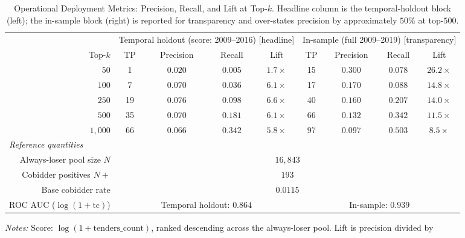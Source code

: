 \begin{table}[htbp]
\centering
\caption[Operational metrics: holdout headline]{Operational
Deployment Metrics: Precision, Recall, and Lift at Top-$k$.
Headline column is the temporal-holdout block (left); the
in-sample block (right) is reported for transparency and
over-states precision by approximately $50\%$ at top-$500$.}
\label{tab:operational_metrics}
\begin{adjustbox}{max width=\textwidth}
\begin{threeparttable}
\small
\begin{tabular}{rcccccccc}
\toprule
& \multicolumn{4}{c}{Temporal holdout (score: 2009--2016) [headline]} & \multicolumn{4}{c}{In-sample (full 2009--2019) [transparency]} \\
\cmidrule(lr){2-5}\cmidrule(lr){6-9}
Top-$k$ & TP & Precision & Recall & Lift & TP & Precision & Recall & Lift \\
\midrule
$50$ & 1 & $0.020$ & $0.005$ & $1.7\!\!\times$ & 15 & $0.300$ & $0.078$ & $26.2\!\!\times$ \\
$100$ & 7 & $0.070$ & $0.036$ & $6.1\!\!\times$ & 17 & $0.170$ & $0.088$ & $14.8\!\!\times$ \\
$250$ & 19 & $0.076$ & $0.098$ & $6.6\!\!\times$ & 40 & $0.160$ & $0.207$ & $14.0\!\!\times$ \\
$500$ & 35 & $0.070$ & $0.181$ & $6.1\!\!\times$ & 66 & $0.132$ & $0.342$ & $11.5\!\!\times$ \\
$1{,}000$ & 66 & $0.066$ & $0.342$ & $5.8\!\!\times$ & 97 & $0.097$ & $0.503$ & $8.5\!\!\times$ \\
\midrule
\multicolumn{9}{l}{\emph{Reference quantities}} \\
Always-loser pool size $N$       & \multicolumn{8}{c}{$16{,}843$} \\
Cobidder positives $N\!\!+\!\!$ & \multicolumn{8}{c}{$193$} \\
Base cobidder rate                & \multicolumn{8}{c}{$0.0115$} \\
ROC AUC ($\log(1{+}\text{tc})$)   & \multicolumn{4}{c}{Temporal holdout: $0.864$} & \multicolumn{4}{c}{In-sample: $0.939$} \\
\bottomrule
\end{tabular}
\begin{tablenotes}
\small
\item \textit{Notes:} Score: $\log(1+\text{tenders\_count})$, ranked
descending across the always-loser pool. Lift is precision divided by

\end{tablenotes}
\end{threeparttable}
\end{adjustbox}
\end{table}
